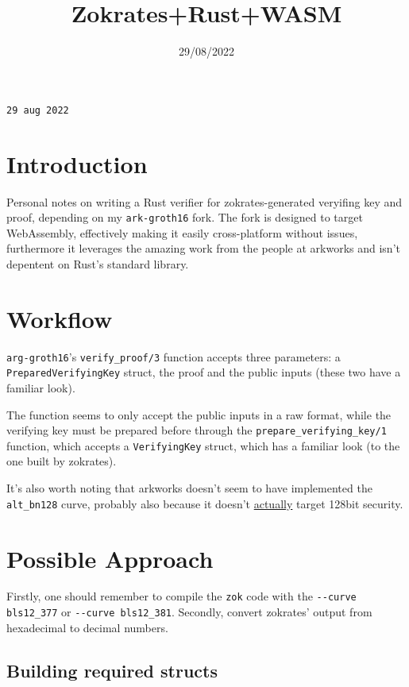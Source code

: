 \documentclass{article}
\title{Zokrates+Rust+WASM}
\date{29/08/2022}
\begin{document}
\maketitle

\texttt{29 aug 2022}

\section{Introduction}

Personal notes on writing a Rust verifier for zokrates-generated veryifing key and proof, depending on my \lstinline{ark-groth16} fork. The fork is designed to target WebAssembly, effectively making it easily cross-platform without issues, furthermore it leverages the amazing work from the people at arkworks and isn't depentent on Rust's standard library.

\section{Workflow}
\lstinline{arg-groth16}'s \lstinline{verify_proof/3} function accepts three parameters: a \lstinline{PreparedVerifyingKey} struct, the proof and the public inputs (these two have a familiar look).

The function seems to only accept the public inputs in a raw format, while the verifying key must be prepared before through the \lstinline{prepare_verifying_key/1} function, which accepts a \lstinline{VerifyingKey} struct, which has a familiar look (to the one built by zokrates).

It's also worth noting that arkworks doesn't seem to have implemented the \lstinline{alt_bn128} curve, probably also because it doesn't \href{https://moderncrypto.org/mail-archive/curves/2016/000740.html}{actually} target 128bit security.

\section{Possible Approach}
Firstly, one should remember to compile the \lstinline{zok} code with the \lstinline{--curve bls12_377} or \lstinline{--curve bls12_381}. Secondly, convert zokrates' output from hexadecimal to decimal numbers.

\subsection{Building required structs}
\end{document}
